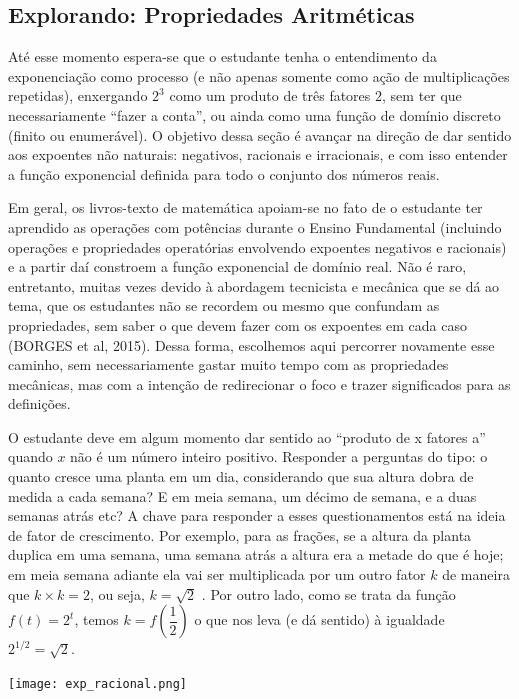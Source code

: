 \begin{paginatexto}
\section{Explorando: Propriedades Aritméticas}

Até esse momento espera-se que o estudante tenha o entendimento da exponenciação como processo (e não apenas somente como ação de multiplicações repetidas), enxergando $2^{3}$ como um produto de três fatores $2$, sem ter que necessariamente ``fazer a conta'', ou ainda como uma função de domínio discreto (finito ou enumerável). O objetivo dessa seção é avançar na direção de dar sentido aos expoentes não naturais: negativos, racionais e irracionais, e com isso entender a função exponencial definida para todo o conjunto dos números reais. 

Em geral, os livros-texto de matemática apoiam-se no fato de o estudante ter aprendido as operações com potências durante o Ensino Fundamental (incluindo operações e propriedades operatórias envolvendo expoentes negativos e racionais) e a partir daí constroem a função exponencial de domínio real. Não é raro, entretanto, muitas vezes devido à abordagem tecnicista e mecânica que se dá ao tema, que os estudantes não se recordem ou mesmo que confundam as propriedades, sem saber o que devem fazer com os expoentes em cada caso (BORGES et al, 2015). Dessa forma, escolhemos aqui percorrer novamente esse caminho, sem necessariamente gastar muito tempo com as propriedades mecânicas, mas com a intenção de redirecionar o foco e trazer significados para as definições. 

O estudante deve em algum momento dar sentido ao ``produto de x fatores a'' quando $x$ não é um número inteiro positivo. Responder a perguntas do tipo: o quanto cresce uma planta em um dia, considerando que sua altura dobra de medida a cada semana? E em meia semana, um décimo de semana, e a duas semanas atrás etc? A chave para responder a esses questionamentos está na ideia de fator de crescimento. Por exemplo, para as frações, se a altura da planta duplica em uma semana, uma semana atrás a altura era a metade do que é hoje; em meia semana adiante ela vai ser multiplicada por um outro fator $k$ de maneira que $k \times k=2$, ou seja, $k= \sqrt{2}$ . Por outro lado, como se trata da função $f(t)=2^{t}$, temos $k=f\left( \dfrac{1}{2} \right)$ o que nos leva (e dá sentido) à igualdade $2^{1/2}=\sqrt{2}$.

\resizebox{\linewidth}{!}
{
\texttt{[image: exp\_racional.png]}
}


\end{paginatexto}
